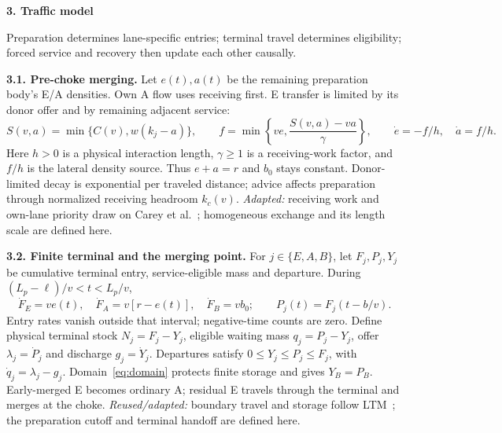 \documentclass[10pt,a4paper]{article}
\newcommand{\head}[1]{\par\vspace{4pt}\noindent\textbf{#1}\par\nobreak\vspace{1pt}}
\begin{document}
\head{3. Traffic model}
Preparation determines lane-specific entries; terminal travel determines
eligibility; forced service and recovery then update each other causally.

\textbf{3.1. Pre-choke merging.}
Let $e(t),a(t)$ be the remaining preparation body's E/A densities.
Own A flow uses receiving first. E transfer is limited by its donor offer
and by remaining adjacent service:
\begin{equation}
 S(v,a)=\min\{C(v),w(k_j-a)\},\qquad
 f=\min\!\left\{ve,\frac{S(v,a)-va}{\gamma}\right\},\qquad
 \dot e=-f/h,\quad \dot a=f/h.
 \label{eq:prep}
\end{equation}
Here $h>0$ is a physical interaction length, $\gamma\geq1$ is a receiving-work
factor, and $f/h$ is the lateral density source. Thus $e+a=r$ and $b_0$
stays constant. Donor-limited decay is exponential per traveled distance;
advice affects preparation through normalized receiving headroom $k_c(v)$.
\emph{Adapted:} receiving work and own-lane priority draw on
Carey et al.~\cite{carey}; homogeneous exchange and its length scale are
defined here.

\textbf{3.2. Finite terminal and the merging point.}
For $j\in\{E,A,B\}$, let $F_j,P_j,Y_j$ be cumulative terminal entry,
service-eligible mass and departure. During
$(L_p-\ell)/v<t<L_p/v$,
\begin{equation}
 \dot F_E=ve(t),\quad \dot F_A=v[r-e(t)],\quad \dot F_B=vb_0;
 \qquad P_j(t)=F_j(t-b/v).
 \label{eq:arrivals}
\end{equation}
Entry rates vanish outside that interval; negative-time counts are zero.
Define physical terminal stock $N_j=F_j-Y_j$, eligible waiting mass
$q_j=P_j-Y_j$, offer $\lambda_j=\dot P_j$ and discharge $g_j=\dot Y_j$.
Departures satisfy $0\leq Y_j\leq P_j\leq F_j$, with
$\dot q_j=\lambda_j-g_j$. Domain~\eqref{eq:domain} protects finite storage
and gives $Y_B=P_B$. Early-merged E becomes ordinary A; residual E travels
through the terminal and merges at the choke.
\emph{Reused/adapted:} boundary travel and storage follow LTM~\cite{jin};
the preparation cutoff and terminal handoff are defined here.
\end{document}
